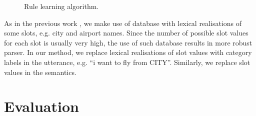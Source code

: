 \documentclass{article}
\begin{document}
\begin{figure}
\vspace{-0.25cm}
\caption{Rule learning algorithm.}
\label{alg:tbl:learning}
\end{figure} 

As in the previous work \cite{mairesse09,he05,zettlemoyer07,meza08b}, we make use of database with lexical realisations of some slots, e.g. city and airport names. Since the number of possible slot values for each slot is usually very high, the use of such database results in more robust parser. In our method, we replace lexical realisations of slot values with category labels in the utterance, e.g. ``i want to fly from CITY''. Similarly, we replace slot values in the semantics.



\section{Evaluation} \label{sec:evaluation}
\end{document}
